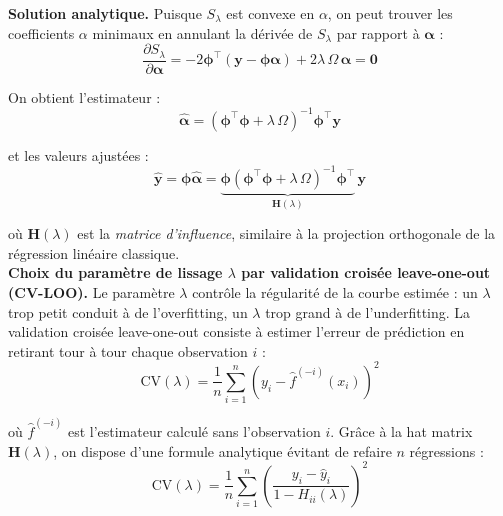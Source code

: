 \documentclass{article}
\begin{document}
	\textbf{Solution analytique.} Puisque $S_{\lambda}$ est convexe en $\alpha$, on peut trouver les coefficients $\alpha$ minimaux en annulant la dérivée de $S_\lambda$ par rapport à 
	$\boldsymbol{\alpha}$ :
	\begin{equation}
		\frac{\partial S_\lambda}{\partial \boldsymbol{\alpha}} = 
		-2\mathbf{\phi}^\top(\mathbf{y} - \mathbf{\phi}\boldsymbol{\alpha}) 
		+ 2\lambda\, \Omega\, \boldsymbol{\alpha} = \mathbf{0}
	\end{equation}
	
	On obtient l'estimateur :
	\begin{equation}
		\hat{\boldsymbol{\alpha}} = \left(\mathbf{\phi}^\top \mathbf{\phi} + 
		\lambda\, \Omega\right)^{-1} \mathbf{\phi}^\top \mathbf{y}
	\end{equation}
	
	et les valeurs ajustées :
	\begin{equation}
		\hat{\mathbf{y}} = \mathbf{\phi}\hat{\boldsymbol{\alpha}} = 
		\underbrace{\mathbf{\phi}\left(\mathbf{\phi}^\top \mathbf{\phi} + 
			\lambda\, \Omega\right)^{-1} \mathbf{\phi}^\top}_{\mathbf{H}(\lambda)}\, \mathbf{y}
	\end{equation}
	
	où $\mathbf{H}(\lambda)$ est la \textit{matrice d'influence}, 
	similaire à la projection orthogonale de la régression linéaire classique.\\
	
	\textbf{Choix du paramètre de lissage $\lambda$ par validation croisée 
		leave-one-out (CV-LOO).} Le paramètre $\lambda$ contrôle la régularité de 
	la courbe estimée : un $\lambda$ trop petit conduit à de l'overfitting, 
	un $\lambda$ trop grand à de l'underfitting. La validation croisée 
	leave-one-out consiste à estimer l'erreur de prédiction en retirant tour 
	à tour chaque observation $i$ :
	\begin{equation}
		\text{CV}(\lambda) = \frac{1}{n}\sum_{i=1}^{n} 
		\left(y_i - \hat{f}^{(-i)}(x_i)\right)^{2}
	\end{equation}
	
	où $\hat{f}^{(-i)}$ est l'estimateur calculé sans l'observation $i$. 
	Grâce à la hat matrix $\mathbf{H}(\lambda)$, on dispose d'une formule 
	analytique évitant de refaire $n$ régressions :
	\begin{equation}
		\text{CV}(\lambda) = \frac{1}{n}\sum_{i=1}^{n} 
		\left(\frac{y_i - \hat{y}_i}{1 - H_{ii}(\lambda)}\right)^{2}
	\end{equation}
	
\end{document}
